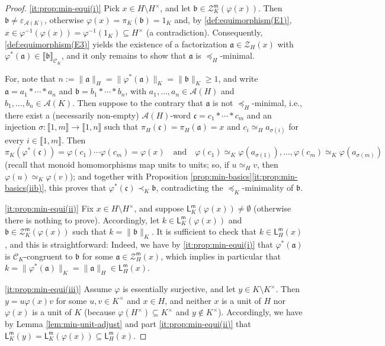 \documentclass{report}
\newcommand{\llb}{\llbracket}
\newcommand{\rrb}{\rrbracket}
\newcommand{\m}{{\mathsf{m}}}
\renewcommand{\:}{\text{:}}
\theoremstyle{definition}
\begin{document}
\begin{proof}
	\ref{it:prop:min-equi(i)}
	Pick $x\in H \setminus H^\times$, and let $\mathfrak b \in \mathcal{Z}_K^\m(\varphi(x))$. Then $\mathfrak b \ne \varepsilon_{\mathscr A(K)}$, otherwise $\varphi(x) = \pi_K(\mathfrak b) = 1_K$ and, by \ref{def:equimorphism(E1)}, $x \in \varphi^{-1}(\varphi(x)) = \varphi^{-1}(1_K) \subseteq H^\times$ (a contradiction). Consequently, \ref{def:equimorphism(E3)} yields the existence of a factorization $\mathfrak{a}\in \mathcal{Z}_H(x)$ with $\varphi^*(\mathfrak{a}) \in \llb \mathfrak{b} \rrb_{\mathscr{C}_K}$, and it only remains to show that $\mathfrak a$ is $\preceq_H$-minimal. 
	
	For, note that $n := \|\mathfrak a\|_H = \|\varphi^\ast(\mathfrak a)\|_K = \|\mathfrak b\|_K \ge 1$, and write $\mathfrak a = a_1 \ast \cdots \ast a_n$ and $\mathfrak b = b_1 \ast \cdots \ast b_n$, with $a_1, \ldots, a_n \in \mathscr A(H)$ and $b_1, \ldots, b_n \in \mathscr A(K)$. Then suppose to the contrary that $\mathfrak a$ is not $\preceq_H$-minimal, i.e., there exist a (necessarily non-empty) $\mathscr A(H)$-word $\mathfrak{c} = c_1 \ast \cdots \ast c_m$ and an injection $\sigma: \llb 1, m \rrb \to \llb 1, n \rrb$ such that $\pi_H(\mathfrak c) = \pi_H(\mathfrak a) = x$ and $c_i \simeq_H a_{\sigma(i)}$ for every $i \in \llb 1, m \rrb$. Then
	\[
	\pi_K(\varphi^\ast(\mathfrak c)) = \varphi(c_1) \cdots \varphi(c_m) = \varphi(x)
	\quad\text{and}\quad
	\varphi(c_1) \simeq_K \varphi(a_{\sigma(1)}), \ldots, \varphi(c_m) \simeq_K \varphi(a_{\sigma(m)})
	\]
	(recall that monoid hom\-o\-mor\-phisms map units to units; so, if $u \simeq_H v$, then $\varphi(u) \simeq_K \varphi(v)$); and together with Proposition \ref{prop:min-basics}\ref{it:prop:min-basics(iib)}, this proves that 
	$\varphi^\ast(\mathfrak c) \prec_K \mathfrak b$, contradicting the $\preceq_K$-minimality of $\mathfrak b$.
	
	\ref{it:prop:min-equi(ii)} Fix $x \in H \setminus H^\times$, and suppose $\mathsf{L}_K^\m(\varphi(x)) \ne \emptyset$ (otherwise there is nothing to prove). Accordingly, let $k \in \mathsf{L}_K^\m(\varphi(x))$ and $\mathfrak b \in \mathcal Z_K^\m(\varphi(x))$ such that $k = \|\mathfrak b\|_K$. It is sufficient to check that $k \in \mathsf L_H^\m(x)$, and this is straightforward: Indeed, we have by \ref{it:prop:min-equi(i)} that $\varphi^\ast(\mathfrak a)$ is $\mathscr C_K$-congruent to $\mathfrak b$ for some $\mathfrak a \in \mathcal Z_H^\m(x)$, which implies in particular that $k = \|\varphi^\ast(\mathfrak a)\|_K = \|\mathfrak a\|_H \in \mathsf L_H^\m(x)$.
	
	\ref{it:prop:min-equi(iii)} Assume $\varphi$ is essentially surjective, and let $y \in K \setminus K^\times$. Then $y = u \varphi(x) v$ for some $u,v\in K^\times$ and $x\in H$, and neither $x$ is a unit of $H$ nor $\varphi(x)$ is a unit of $K$ (because $\varphi(H^\times) \subseteq K^\times$ and $y \notin K^\times$). Accordingly, we have by Lemma \ref{lem:min-unit-adjust} and part \ref{it:prop:min-equi(ii)} that $\mathsf{L}_K^\m(y) = \mathsf{L}_K^\m(\varphi(x)) \subseteq \mathsf{L}_H^\m(x)$.
\end{proof}
\end{document}
